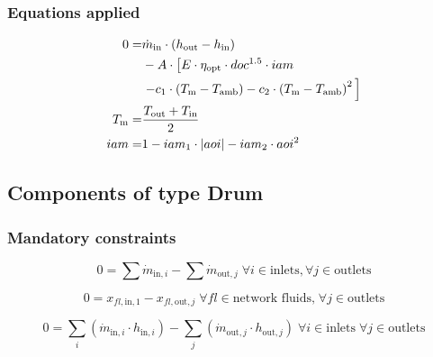 \documentclass[]{article}
\begin{document}
\subsubsection{Equations applied}

\begin{equation}
\label{eq:ParabolicTrough_energy_group}
\begin{split}
0 = & \dot{m}_\mathrm{in} \cdot \left( h_\mathrm{out} - h_\mathrm{in} \right)\\
& - A \cdot \left[E \cdot \eta_\mathrm{opt} \cdot doc^{1.5}\cdot iam \right. \\
&\left. -c_1\cdot\left(T_\mathrm{m}-T_\mathrm{amb}\right) -c_2 \cdot \left(T_\mathrm{m} - T_\mathrm{amb}\right)^2\vphantom{\eta_\mathrm{opt}\cdot doc^{1.5}}\right]\\
T_\mathrm{m}=&\frac{T_\mathrm{out}+T_\mathrm{in}}{2}\\
iam = & 1 - iam_1 \cdot |aoi| - iam_2 \cdot aoi^2\\
\end{split}
\end{equation}


\subsection{Components of type Drum}

\subsubsection{Mandatory constraints}

\begin{equation}
\label{eq:Drum_mass_flow_constraints}
0 =\sum\dot{m}_{\mathrm{in},i}-\sum\dot{m}_{\mathrm{out},j}\;\forall i \in \text{inlets}, \forall j \in \text{outlets}
\end{equation}

\begin{equation}
\label{eq:Drum_fluid_constraints}
0 = x_{fl\mathrm{,in,1}} - x_{fl\mathrm{,out,}j}\; \forall fl \in \text{network fluids,} \; \forall j \in\text{outlets}
\end{equation}

\begin{equation}
\label{eq:Drum_energy_balance_constraints}
0=\sum_i\left(\dot{m}_{\mathrm{in,}i}\cdot h_{\mathrm{in,}i}\right) - \sum_j \left(\dot{m}_{\mathrm{out,}j} \cdot h_{\mathrm{out,}j} \right) \; \forall i \in \text{inlets} \;\forall j \in \text{outlets}
\end{equation}
\end{document}
